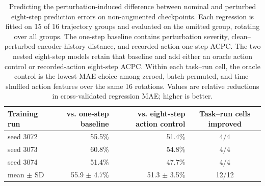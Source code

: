 \begin{table}[t]
\centering
\caption{Predicting the perturbation-induced difference between nominal and perturbed eight-step prediction errors on non-augmented checkpoints. Each regression is fitted on 15 of 16 trajectory groups and evaluated on the omitted group, rotating over all groups. The one-step baseline contains perturbation severity, clean--perturbed encoder-history distance, and recorded-action one-step ACPC. The two nested eight-step models retain that baseline and add either an oracle action control or recorded-action eight-step ACPC. Within each task--run cell, the oracle control is the lowest-MAE choice among zeroed, batch-permuted, and time-shuffled action features over the same 16 rotations. Values are relative reductions in cross-validated regression MAE; higher is better.}
\label{tab:target-aligned-acpc}
\small
\setlength{\tabcolsep}{6pt}
\begin{tabular}{lrrc}
\toprule
Training run & vs. one-step baseline & vs. eight-step action control & Task--run cells improved \\
\midrule
seed 3072 & 55.5\% & 51.4\% & 4/4 \\
seed 3073 & 60.8\% & 54.8\% & 4/4 \\
seed 3074 & 51.4\% & 47.7\% & 4/4 \\
\midrule
mean $\pm$ SD & 55.9 $\pm$ 4.7\% & 51.3 $\pm$ 3.5\% & 12/12 \\
\bottomrule
\end{tabular}
\end{table}
